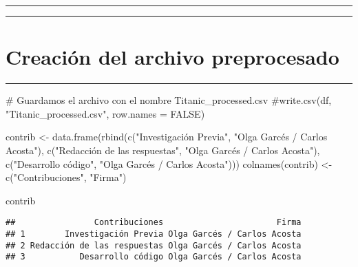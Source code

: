 \documentclass[
]{article}
\newenvironment{Shaded}{\begin{snugshade}}{\end{snugshade}}
\newcommand{\CommentTok}[1]{\textcolor[rgb]{0.50,0.62,0.50}{#1}}
\newcommand{\KeywordTok}[1]{\textcolor[rgb]{0.94,0.87,0.69}{#1}}
\newcommand{\NormalTok}[1]{\textcolor[rgb]{0.80,0.80,0.80}{#1}}
\newcommand{\OperatorTok}[1]{\textcolor[rgb]{0.94,0.94,0.82}{#1}}
\newcommand{\StringTok}[1]{\textcolor[rgb]{0.80,0.58,0.58}{#1}}
\begin{document}
\begin{center}\rule{0.5\linewidth}{0.5pt}\end{center}

\begin{center}\rule{0.5\linewidth}{0.5pt}\end{center}

\hypertarget{creaciuxf3n-del-archivo-preprocesado}{%
\section{\texorpdfstring{\textbf{Creación del archivo
preprocesado}}{Creación del archivo preprocesado}}\label{creaciuxf3n-del-archivo-preprocesado}}

\begin{center}\rule{0.5\linewidth}{0.5pt}\end{center}

\begin{Shaded}
\begin{Highlighting}[]
\CommentTok{# Guardamos el archivo con el nombre Titanic_processed.csv}
\CommentTok{#write.csv(df, "Titanic_processed.csv", row.names = FALSE)}
\end{Highlighting}
\end{Shaded}

\begin{Shaded}
\begin{Highlighting}[]
\NormalTok{contrib <-}\StringTok{ }\KeywordTok{data.frame}\NormalTok{(}\KeywordTok{rbind}\NormalTok{(}\KeywordTok{c}\NormalTok{(}\StringTok{"Investigación Previa"}\NormalTok{, }\StringTok{"Olga Garcés / Carlos Acosta"}\NormalTok{),}
                            \KeywordTok{c}\NormalTok{(}\StringTok{"Redacción de las respuestas"}\NormalTok{, }\StringTok{"Olga Garcés / Carlos Acosta"}\NormalTok{),}
                            \KeywordTok{c}\NormalTok{(}\StringTok{"Desarrollo código", "}\NormalTok{Olga Garcés }\OperatorTok{/}\StringTok{ }\NormalTok{Carlos Acosta}\StringTok{")))}
\StringTok{colnames(contrib) <- c("}\NormalTok{Contribuciones}\StringTok{", "}\NormalTok{Firma}\StringTok{")}

\StringTok{contrib}
\end{Highlighting}
\end{Shaded}

\begin{verbatim}
##                Contribuciones                       Firma
## 1        Investigación Previa Olga Garcés / Carlos Acosta
## 2 Redacción de las respuestas Olga Garcés / Carlos Acosta
## 3           Desarrollo código Olga Garcés / Carlos Acosta
\end{verbatim}
\end{document}
